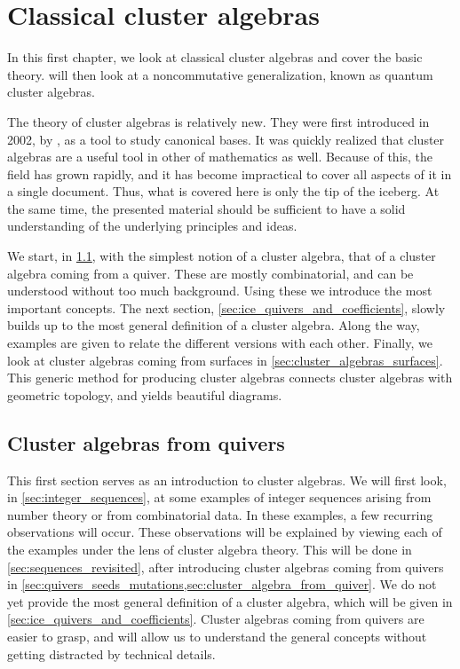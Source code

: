 \chapter{Classical cluster algebras}
\chaptertoc

\noindent
In this first chapter, we look at classical cluster algebras and cover the basic theory.  will then look at a noncommutative generalization, known as quantum cluster algebras.

The theory of cluster algebras is relatively new. They were first introduced in 2002,
by \textcite{FominZelevinsky2002CAF}, as a tool to study canonical bases. It was
quickly realized that cluster algebras are a useful tool in other of mathematics as
well. Because of this, the field has grown rapidly, and it has become impractical to
cover all aspects of it in a single document. Thus, what is covered here is only the
tip of the iceberg. At the same time, the presented material should be sufficient to
have a solid understanding of the underlying principles and ideas.

We start, in \cref{sec:cluster_algebras_quivers}, with the simplest notion of a cluster
algebra, that of a cluster algebra coming from a quiver. These are mostly
combinatorial, and can be understood without too much background. Using these we
introduce the most important concepts. The next section,
\cref{sec:ice_quivers_and_coefficients}, slowly builds up to the most general
definition of a cluster algebra. Along the way, examples are given to relate the
different versions with each other. Finally, we look at cluster algebras coming from
surfaces in \cref{sec:cluster_algebras_surfaces}. This generic method for producing
cluster algebras connects cluster algebras with geometric topology, and yields
beautiful diagrams.

\section{Cluster algebras from quivers}\label{sec:cluster_algebras_quivers}

This first section serves as an introduction to cluster algebras. We will first look,
in \cref{sec:integer_sequences}, at some examples of integer sequences arising from
number theory or from combinatorial data. In these examples, a few recurring
observations will occur. These observations will be explained by viewing each of the
examples under the lens of cluster algebra theory. This will be done in
\cref{sec:sequences_revisited}, after introducing cluster algebras coming from quivers
in \cref{sec:quivers_seeds_mutations,sec:cluster_algebra_from_quiver}. We do not yet
provide the most general definition of a cluster algebra, which will be given in
\cref{sec:ice_quivers_and_coefficients}. Cluster algebras coming from quivers are
easier to grasp, and will allow us to understand the general concepts without getting
distracted by technical details.

